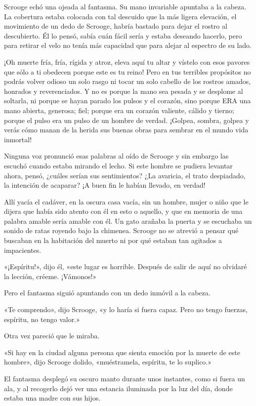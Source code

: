 \documentclass{novela}
\begin{document}
 Scrooge echó una ojeada al fantasma. Su mano invariable apuntaba a la cabeza. La cobertura estaba colocada con tal descuido que la más ligera elevación, el movimiento de un dedo de Scrooge, habría bastado para dejar el rostro al descubierto. Él lo pensó, sabía cuán fácil sería y estaba deseando hacerlo, pero para retirar el velo no tenía más capacidad que para alejar al espectro de su lado.

 ¡Oh muerte fría, fría, rígida y atroz, eleva aquí tu altar y vístelo con esos pavores que sólo a ti obedecen porque este es tu reino! Pero en tus terribles propósitos no podrás volver odioso un solo rasgo ni tocar un solo cabello de los rostros amados, honrados y reverenciados. Y no es porque la mano sea pesada y se desplome al soltarla, ni porque se hayan parado los pulsos y el corazón, sino porque ERA una mano abierta, generosa; fiel; porque era un corazón valiente, cálido y tierno; porque el pulso era un pulso de un hombre de verdad. ¡Golpea, sombra, golpea y verás cómo manan de la herida sus buenas obras para sembrar en el mundo vida inmortal!

 Ninguna voz pronunció esas palabras al oído de Scrooge y sin embargo las escuchó cuando estaba mirando el lecho. Si este hombre se pudiera levantar ahora, pensó, ¿cuáles serían sus sentimientos? ¿La avaricia, el trato despiadado, la intención de acaparar? ¡A buen fin le habían llevado, en verdad!

 Allí yacía el cadáver, en la oscura casa vacía, sin un hombre, mujer o niño que le dijera que había sido atento con él en esto o aquello, y que en memoria de una palabra amable sería amable con él. Un gato arañaba la puerta y se escuchaba un sonido de ratas royendo bajo la chimenea. Scrooge no se atrevió a pensar qué buscaban en la habitación del muerto ni por qué estaban tan agitados a impacientes.

 «¡Espíritu!», dijo él, «este lugar es horrible. Después de salir de aquí no olvidaré la lección, créeme. ¡Vámonos!»

 Pero el fantasma siguió apuntando con un dedo inmóvil a la cabeza.

 «Te comprendo», dijo Scrooge, «y lo haría si fuera capaz. Pero no tengo fuerzas, espíritu, no tengo valor.»

 Otra vez pareció que le miraba.

 «Si hay en la ciudad alguna persona que sienta emoción por la muerte de este hombre», dijo Scrooge dolido, «muéstramela, espíritu, te lo suplico.»

 El fantasma desplegó su oscuro manto durante unos instantes, como si fuera un ala, y al recogerlo dejó ver una estancia iluminada por la luz del día, donde estaba una madre con sus hijos.
\end{document}
